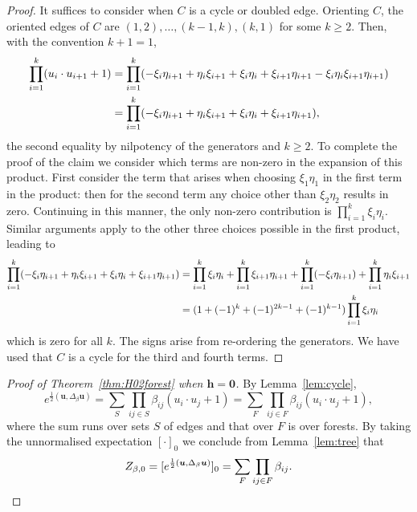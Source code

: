 \documentclass[11pt]{amsart}
\numberwithin{equation}{section}
\numberwithin{theorem}{section}
\newcommand{\V}[1]{\boldsymbol{#1}}
\begin{document}
\begin{proof}
  It suffices to consider when $C$ is a cycle or doubled
  edge. Orienting $C$, the oriented edges of $C$ are
  $(1,2),\dots, (k-1,k),(k,1)$ for some $k\geq 2$. Then, with the
  convention $k+1=1$,
  \begin{align}
    \prod_{i=1}^{k} (u_i\cdot u_{i+1}+1)
    &= 
      \prod_{i=1}^{k}(-\xi_{i}\eta_{i+1}+\eta_{i}\xi_{i+1} + \xi_{i}\eta_{i}+\xi_{i+1}\eta_{i+1} -
      \xi_{i}\eta_{i}\xi_{i+1}\eta_{i+1}) \nonumber\\
      &=\prod_{i=1}^{k}(-\xi_{i}\eta_{i+1}+\eta_{i}\xi_{i+1} +
        \xi_{i}\eta_{i}+\xi_{i+1}\eta_{i+1})
        ,
  \end{align}
  the second equality by nilpotency of the generators and $k\geq
  2$. To complete the proof of the claim we consider which terms are
  non-zero in the expansion of this product. First consider the term
  that arises when choosing $\xi_{1}\eta_{1}$ in the first term in the
  product: then for the second term any choice other than
  $\xi_{2}\eta_{2}$ results in zero. Continuing in this manner, the
  only non-zero contribution is
  $\prod_{i=1}^{k}\xi_{i}\eta_{i}$. Similar arguments apply to the
  other three choices possible in the first product, leading to 
  \begin{align}
    \prod_{i=1}^{k}(-\xi_{i}\eta_{i+1}+\eta_{i}\xi_{i+1} +
        \xi_{i}\eta_{i}+\xi_{i+1}\eta_{i+1}) &=
        \prod_{i=1}^{k}\xi_{i}\eta_{i} +
        \prod_{i=1}^{k}\xi_{i+1}\eta_{i+1} +
        \prod_{i=1}^{k}(-\xi_{i}\eta_{i+1}) +
        \prod_{i=1}^{k}\eta_{i}\xi_{i+1} \nonumber\\
    &= (1 + (-1)^{k}+(-1)^{2k-1}+(-1)^{k-1}) \prod_{i=1}^{k}\xi_{i}\eta_{i}
  \end{align}
  which is zero for all $k$. The signs arise from re-ordering the
  generators. We have used that $C$ is a cycle for the third and
  fourth terms.
\end{proof}

\begin{proof}[Proof of Theorem~\ref{thm:H02forest} when $\V{h}=\V{0}$]
  By Lemma~\ref{lem:cycle}, 
  \begin{equation}
    \label{eq:Rep1}
    e^{\frac12 (\V{u},\Delta_\beta \V{u})}
    = \sum_{S} \prod_{ij \in S} \beta_{ij} (u_i\cdot u_j+1)
    = \sum_{F} \prod_{ij \in F} \beta_{ij} (u_i\cdot u_j+1),
  \end{equation}
  where the sum runs over sets $S$ of edges and that over $F$ is over forests. 
  By taking the
  unnormalised expectation $[\cdot]_0$ we conclude from Lemma~\ref{lem:tree} that
  \begin{equation} \label{e:Zbetapf}
    Z_{\beta,0}
    = [e^{\frac12 (\V{u},\Delta_\beta \V{u})}]_0
    = \sum_{F} \prod_{ij \in F} \beta_{ij}.\qedhere
  \end{equation}
\end{proof}
\end{document}
